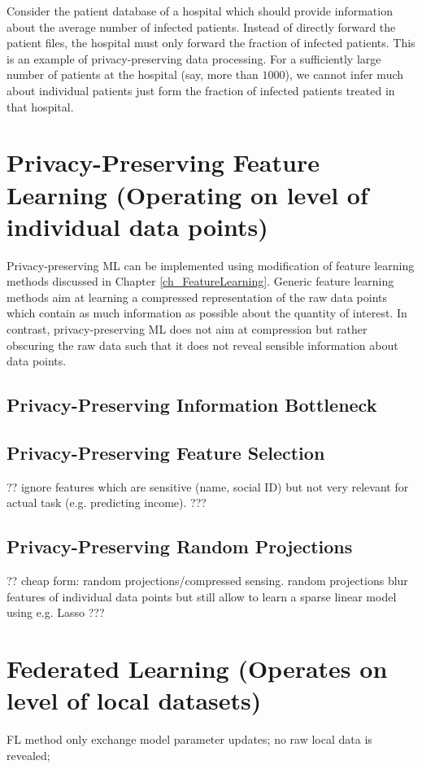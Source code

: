 \documentclass[12pt]{report}
\begin{document}
Consider the patient database of a hospital which should provide information 
about the average number of infected patients. Instead of directly forward 
the patient files, the hospital must only forward the fraction of infected patients. 
This is an example of privacy-preserving data processing. For a sufficiently large 
number of patients at the hospital (say, more than $1000$), we cannot infer much 
about individual patients just form the fraction of infected patients treated in that 
hospital. 

\section{Privacy-Preserving Feature Learning (Operating on level of individual data points)}

Privacy-preserving ML can be implemented using modification of feature learning 
methods discussed in Chapter \ref{ch_FeatureLearning}. Generic feature learning 
methods aim at learning a compressed representation of the raw data points which 
contain as much information as possible about the quantity of interest. In contrast, 
privacy-preserving ML does not aim at compression but rather obscuring the raw 
data such that it does not reveal sensible information about data points. 


\subsection{Privacy-Preserving Information Bottleneck} %


\subsection{Privacy-Preserving Feature Selection} 
?? ignore features which are sensitive (name, social ID) but not very relevant for actual task (e.g. predicting income).    ???

\subsection{Privacy-Preserving Random Projections} 
?? cheap form: random projections/compressed sensing. random projections blur features of individual 
data points but still allow to learn a sparse linear model using e.g. Lasso ???






\section{Federated Learning (Operates on level of local datasets)}
FL method only exchange model parameter updates; no raw local data is revealed; 
\end{document}
